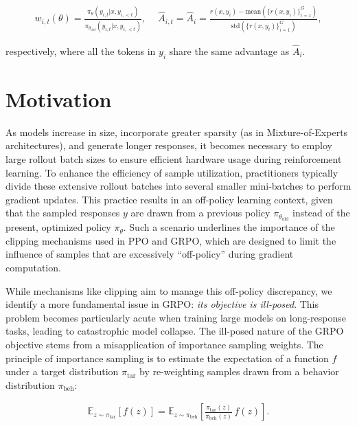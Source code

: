 \begin{align}
    w_{i,t}(\theta)=\frac{ \pi_{\theta} (y_{i,t} | x, y_{i,<t}) }{ \pi_{\theta_\text{old}} (y_{i,t} | x,y_{i,<t})},\quad\ 
    \widehat{A}_{i,t} = \widehat{A}_{i} = \frac{r(x, y_i) - \mathrm{mean} \left( \{ r(x, y_i) \}_{i=1}^G \right) }{ \mathrm{std} \left( \{ r(x, y_i) \}_{i=1}^G \right) },
\end{align}

respectively, where all the tokens in $y_i$ share the same advantage as $\widehat{A}_{i}$.

\section{Motivation}
\label{sec:motivation}

As models increase in size, incorporate greater sparsity (as in Mixture-of-Experts architectures), and generate longer responses, it becomes necessary to employ large rollout batch sizes to ensure efficient hardware usage during reinforcement learning. To enhance the efficiency of sample utilization, practitioners typically divide these extensive rollout batches into several smaller mini-batches to perform gradient updates. This practice results in an off-policy learning context, given that the sampled responses $y$ are drawn from a previous policy $\pi_{\theta_\text{old}}$ instead of the present, optimized policy $\pi_\theta$. Such a scenario underlines the importance of the clipping mechanisms used in PPO and GRPO, which are designed to limit the influence of samples that are excessively ``off-policy'' during gradient computation.

While mechanisms like clipping aim to manage this off-policy discrepancy, we identify a more fundamental issue in GRPO: \textit{its objective is ill-posed}. This problem becomes particularly acute when training large models on long-response tasks, leading to catastrophic model collapse. The ill-posed nature of the GRPO objective stems from a misapplication of importance sampling weights. The principle of importance sampling is to estimate the expectation of a function $f$ under a target distribution $\pi_\text{tar}$ by re-weighting samples drawn from a behavior distribution $\pi_\text{beh}$:

\begin{align}
\mathbb{E}_{z \sim \pi_\text{tar}} \left[ f(z) \right] = \mathbb{E}_{z \sim \pi_\text{beh}} \left[ \frac{ \pi_\text{tar} (z) }{ \pi_\text{beh} (z)} \, f(z) \right].
\end{align}

